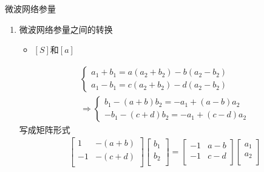 \begin{frame}{微波网络参量}
    \begin{enumerate}
        \resume
        \item 微波网络参量之间的转换
        \begin{itemize}
            \item $[S]$和$[a]$
        \end{itemize}
        \begin{align*}
            \begin{cases}
                a_1+b_1=a(a_2+b_2)-b(a_2-b_2)\\
                a_1-b_1=c(a_2+b_2)-d(a_2-b_2)
            \end{cases}\\
            \Rightarrow
            \begin{cases}
                b_1-(a+b)b_2=-a_1+(a-b)a_2\\
                -b_1-(c+d)b_2=-a_1+(c-d)a_2
            \end{cases}
        \end{align*}
        写成矩阵形式
        \begin{align*}
            \begin{bmatrix*}
                1 & -(a+b) \\
                -1 & -(c+d) \\
            \end{bmatrix*}
            \begin{bmatrix*}
                b_1 \\
                b_2 \\
            \end{bmatrix*}
            =
            \begin{bmatrix*}
                -1 & a-b \\
                -1 & c-d \\
            \end{bmatrix*}
            \begin{bmatrix*}
                a_1 \\
                a_2 \\
            \end{bmatrix*}
        \end{align*}
    \end{enumerate}
\end{frame}

